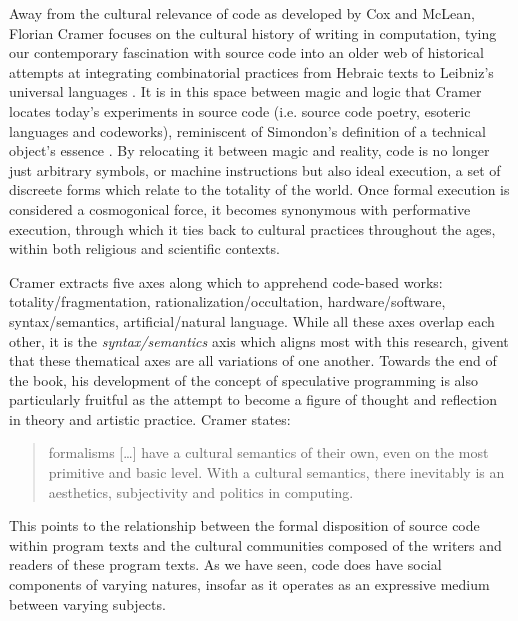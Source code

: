 Away from the cultural relevance of code as developed by Cox and McLean, Florian Cramer focuses on the cultural history of writing in computation, tying our contemporary fascination with source code into an older web of historical attempts at integrating combinatorial practices from Hebraic texts to Leibniz's universal languages \citep{cramer_words_2003}. It is in this space between magic and logic that Cramer locates today's experiments in source code (i.e. source code poetry, esoteric languages and codeworks), reminiscent of Simondon's definition of a technical object's essence \citep{simondon_mode_1958}. By relocating it between magic and reality, code is no longer just arbitrary symbols, or machine instructions but also ideal execution, a set of discreete forms which relate to the totality of the world. Once formal execution is considered a cosmogonical force, it becomes synonymous with performative execution, through which it ties back to cultural practices throughout the ages, within both religious and scientific contexts.

Cramer extracts five axes along which to apprehend code-based works: totality/fragmentation, rationalization/occultation, hardware/software, syntax/semantics, artificial/natural language. While all these axes overlap each other, it is the \emph{syntax/semantics} axis which aligns most with this research, givent that these thematical axes are all variations of one another. Towards the end of the book, his development of the concept of speculative programming is also particularly fruitful as the attempt to become a figure of thought and reflection in theory and artistic practice. Cramer states:

\begin{quote}
    formalisms [\dots] have a cultural semantics of their own, even on the most primitive and basic level. With a cultural semantics, there inevitably is an aesthetics, subjectivity and politics in computing. \citep{cramer_words_2003}
\end{quote}

This points to the relationship between the formal disposition of source code within program texts and the cultural communities composed of the writers and readers of these program texts. As we have seen, code does have social components of varying natures, insofar as it operates as an expressive medium between varying subjects.

